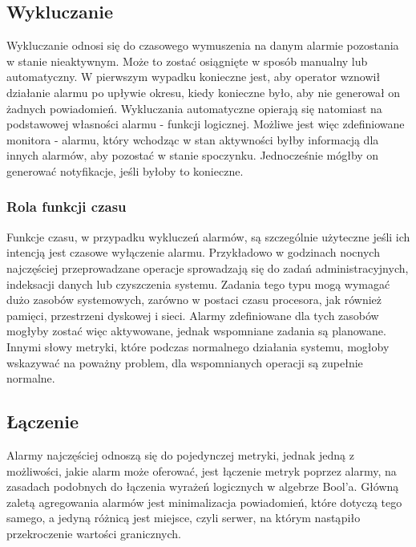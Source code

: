     \subsection{Wykluczanie}
    
        Wykluczanie odnosi się do czasowego wymuszenia na danym alarmie pozostania w stanie nieaktywnym.
        Może to zostać osiągnięte w sposób manualny lub automatyczny. W pierwszym wypadku konieczne jest,
        aby operator wznowił działanie alarmu po upływie okresu, kiedy konieczne było, aby nie
        generował on żadnych powiadomień. Wykluczania automatyczne opierają się natomiast na podstawowej własności
        alarmu - funkcji logicznej. Możliwe jest więc zdefiniowane monitora - alarmu, który wchodząc
        w stan aktywności byłby informacją dla innych alarmów, aby pozostać w stanie spoczynku. Jednocześnie
        mógłby on generować notyfikacje, jeśli byłoby to konieczne.
    
        \subsubsection{Rola funkcji czasu}
        Funkcje czasu, w przypadku wykluczeń alarmów, są szczególnie użyteczne jeśli ich intencją jest czasowe wyłączenie
        alarmu. Przykładowo w godzinach nocnych najczęściej przeprowadzane operacje sprowadzają się do zadań 
        administracyjnych, indeksacji danych lub czyszczenia systemu. Zadania tego typu mogą wymagać dużo
        zasobów systemowych, zarówno w postaci czasu procesora, jak również pamięci, przestrzeni dyskowej i sieci.
        Alarmy zdefiniowane dla tych zasobów mogłyby zostać więc aktywowane, jednak wspomniane zadania
        są planowane. Innymi słowy metryki, które podczas normalnego działania systemu, mogłoby wskazywać
        na poważny problem, dla wspomnianych operacji są zupełnie normalne.  
    
    \subsection{Łączenie}
    \label{chapter:monitoring:anatomy_of_alarm:assocation}
    
        Alarmy najczęściej odnoszą się do pojedynczej metryki, jednak jedną z możliwości, jakie alarm może
        oferować, jest łączenie metryk poprzez alarmy, na zasadach podobnych do łączenia wyrażeń
        logicznych w algebrze Bool'a. Główną zaletą agregowania alarmów jest minimalizacja powiadomień, 
        które dotyczą tego samego, a jedyną różnicą jest miejsce, czyli serwer, na którym nastąpiło
        przekroczenie wartości granicznych. 
    
